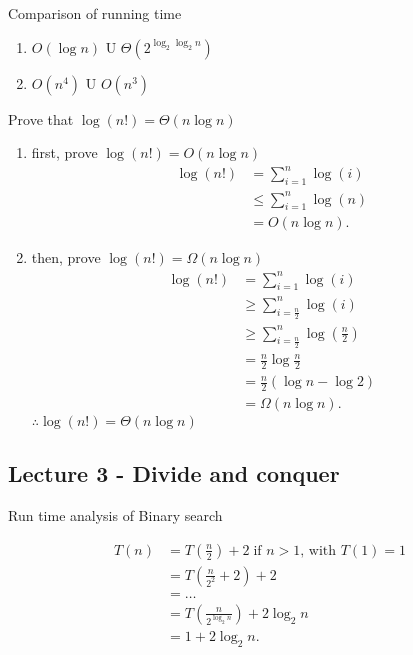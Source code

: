 \documentclass[../../main/main.tex]{subfiles}
\begin{document}
\begin{theorem}
	Comparison of running time
	\begin{enumerate}
		\item $O(\log n)$ U $\Theta(2^{\log_{2}\log_{2} n} )$
		\item $O(n^{4})$ U $O(n^{3})$
	\end{enumerate}
\end{theorem}
\begin{exercise}
	Prove that $\log(n!) = \Theta(n\log n)$
	\begin{enumerate}
		\item first, prove $\log(n!) = O(n\log n)$
		      \begin{align*}
			      \log(n!) & =  \sum^{n}_{i=1} \log(i)   \\
			               & \le \sum^{n}_{i=1}  \log(n) \\
			               & = O(n\log n)
			      .\end{align*}
		\item then, prove $\log(n!) = \Omega(n\log n)$
		      \begin{align*}
			      \log(n!) & =  \sum^{n}_{i=1} \log(i)                       \\
			               & \ge \sum^{n}_{i=\frac{n}{2}}  \log(i)           \\
			               & \ge \sum^{n}_{i=\frac{n}{2}}  \log(\frac{n}{2}) \\
			               & = \frac{n}{2}\log \frac{n}{2}                   \\
			               & = \frac{n}{2}(\log n - \log2)                   \\
			               & = \Omega(n\log n)
			      .\end{align*}
		      $\therefore \log(n!) = \Theta(n\log n)$
	\end{enumerate}
\end{exercise}
\newpage
\subsection{Lecture 3 - Divide and conquer}
\begin{theorem}
	Run time analysis of Binary search

	\begin{align*}
		T(n) & = T(\frac{n}{2}) + 2  \; \text{if $n > 1$, with $T(1) = 1$} \\
		     & = T(\frac{n}{2^2} + 2) + 2                                  \\
		     & = \ldots                                                    \\
		     & = T(\frac{n}{2^{\log_{2}n}})  + 2\log_2n                    \\
		     & = 1 + 2\log_{2}n
		.\end{align*}
\end{theorem}
\end{document}
